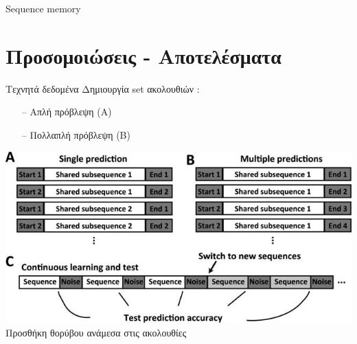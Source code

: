 \documentclass[11pt,center]{beamer}
\begin{document}
\begin{frame}{Sequence memory \tiny{\cite{neuronssynapses}}}
\end{frame}


\section{Προσομοιώσεις - Αποτελέσματα}

\begin{frame}{Τεχνητά δεδομένα}
  Δημιουργία set ακολουθιών \tiny{\cite{continuous,nab}}:
  \begin{itemize}
	\item[--]Απλή πρόβλεψη (A)
	\item[--]Πολλαπλή πρόβλεψη (B)
  \end{itemize}
  \vfill
  \includegraphics[width=0.6 \textwidth,center]{../pics/sequences.jpg}
  \vfill
  \pause
  Προσθήκη θορύβου ανάμεσα στις ακολουθίες
\end{frame}
\end{document}
